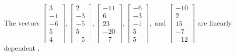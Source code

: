\begin{exercise}
\begin{exerciseStatement}
  \end{exerciseStatement}
  \begin{exerciseAnswer}
   The vectors \(\left[\begin{array}{r}
3 \\
-1 \\
-6 \\
5 \\
4
\end{array}\right] , \left[\begin{array}{r}
2 \\
-3 \\
-5 \\
5 \\
-5
\end{array}\right] , \left[\begin{array}{r}
-11 \\
6 \\
23 \\
-20 \\
-7
\end{array}\right] , \left[\begin{array}{r}
-6 \\
-3 \\
-1 \\
5 \\
5
\end{array}\right] , \text{ and } \left[\begin{array}{r}
-10 \\
2 \\
15 \\
-7 \\
-12
\end{array}\right]\) are 
  	 linearly dependent  .
  


  \end{exerciseAnswer}
\end{exercise}